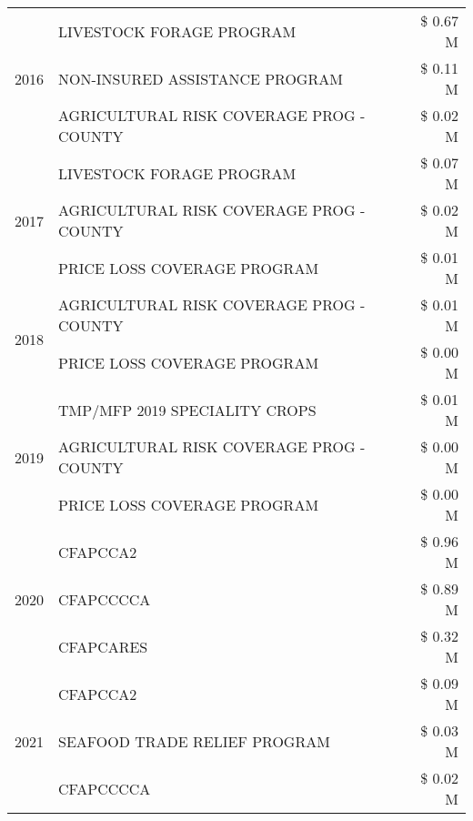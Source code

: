 \begin{tabular}{llr}
\cline{1-3}
\multirow[t]{3}{*}{2016} & LIVESTOCK FORAGE PROGRAM                      & \$ 0.67 M \\
 & NON-INSURED ASSISTANCE PROGRAM                & \$ 0.11 M \\
 & AGRICULTURAL RISK COVERAGE PROG - COUNTY      & \$ 0.02 M \\
\cline{1-3}
\multirow[t]{3}{*}{2017} & LIVESTOCK FORAGE PROGRAM & \$ 0.07 M \\
 & AGRICULTURAL RISK COVERAGE PROG - COUNTY & \$ 0.02 M \\
 & PRICE LOSS COVERAGE PROGRAM & \$ 0.01 M \\
\cline{1-3}
\multirow[t]{2}{*}{2018} & AGRICULTURAL RISK COVERAGE PROG - COUNTY & \$ 0.01 M \\
 & PRICE LOSS COVERAGE PROGRAM & \$ 0.00 M \\
\cline{1-3}
\multirow[t]{3}{*}{2019} & TMP/MFP 2019 SPECIALITY CROPS & \$ 0.01 M \\
 & AGRICULTURAL RISK COVERAGE PROG - COUNTY & \$ 0.00 M \\
 & PRICE LOSS COVERAGE PROGRAM & \$ 0.00 M \\
\cline{1-3}
\multirow[t]{3}{*}{2020} & CFAPCCA2 & \$ 0.96 M \\
 & CFAPCCCCA & \$ 0.89 M \\
 & CFAPCARES & \$ 0.32 M \\
\cline{1-3}
\multirow[t]{3}{*}{2021} & CFAPCCA2 & \$ 0.09 M \\
 & SEAFOOD TRADE RELIEF PROGRAM & \$ 0.03 M \\
 & CFAPCCCCA & \$ 0.02 M \\
\cline{1-3}
\bottomrule
\end{tabular}
